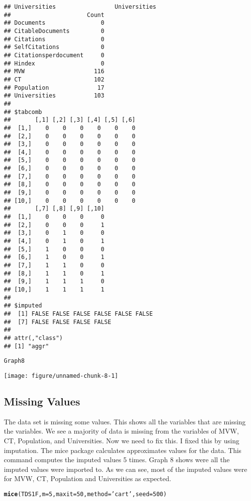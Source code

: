 \documentclass{article}\usepackage[]{graphicx}\usepackage[]{color}
\makeatletter
\def\maxwidth{ %
  \ifdim\Gin@nat@width>\linewidth
    \linewidth
  \else
    \Gin@nat@width
  \fi
}
\newcommand{\hlnum}[1]{\textcolor[rgb]{0.686,0.059,0.569}{#1}}%
\newcommand{\hlstr}[1]{\textcolor[rgb]{0.192,0.494,0.8}{#1}}%
\newcommand{\hlstd}[1]{\textcolor[rgb]{0.345,0.345,0.345}{#1}}%
\newcommand{\hlkwc}[1]{\textcolor[rgb]{0.333,0.667,0.333}{#1}}%
\newcommand{\hlkwd}[1]{\textcolor[rgb]{0.737,0.353,0.396}{\textbf{#1}}}%
\newenvironment{kframe}{%
 \def\at@end@of@kframe{}%
 \ifinner\ifhmode%
  \def\at@end@of@kframe{\end{minipage}}%
  \begin{minipage}{\columnwidth}%
 \fi\fi%
 \def\FrameCommand##1{\hskip\@totalleftmargin \hskip-\fboxsep
 \colorbox{shadecolor}{##1}\hskip-\fboxsep
     \hskip-\linewidth \hskip-\@totalleftmargin \hskip\columnwidth}%
 \MakeFramed {\advance\hsize-\width
   \@totalleftmargin\z@ \linewidth\hsize
   \@setminipage}}%
 {\par\unskip\endMakeFramed%
 \at@end@of@kframe}
\newenvironment{knitrout}{}{} %
\makeatother
\begin{document}
\begin{knitrout}
\begin{kframe}
\begin{verbatim}
## Universities                 Universities
##                      Count
## Documents                0
## CitableDocuments         0
## Citations                0
## SelfCitations            0
## Citationsperdocument     0
## Hindex                   0
## MVW                    116
## CT                     102
## Population              17
## Universities           103
## 
## $tabcomb
##       [,1] [,2] [,3] [,4] [,5] [,6]
##  [1,]    0    0    0    0    0    0
##  [2,]    0    0    0    0    0    0
##  [3,]    0    0    0    0    0    0
##  [4,]    0    0    0    0    0    0
##  [5,]    0    0    0    0    0    0
##  [6,]    0    0    0    0    0    0
##  [7,]    0    0    0    0    0    0
##  [8,]    0    0    0    0    0    0
##  [9,]    0    0    0    0    0    0
## [10,]    0    0    0    0    0    0
##       [,7] [,8] [,9] [,10]
##  [1,]    0    0    0     0
##  [2,]    0    0    0     1
##  [3,]    0    1    0     0
##  [4,]    0    1    0     1
##  [5,]    1    0    0     0
##  [6,]    1    0    0     1
##  [7,]    1    1    0     0
##  [8,]    1    1    0     1
##  [9,]    1    1    1     0
## [10,]    1    1    1     1
## 
## $imputed
##  [1] FALSE FALSE FALSE FALSE FALSE FALSE
##  [7] FALSE FALSE FALSE FALSE
## 
## attr(,"class")
## [1] "aggr"
\end{verbatim}
\begin{alltt}
\hlstd{Graph8}
\end{alltt}
\end{kframe}
\texttt{[image: figure/unnamed-chunk-8-1]} 

\end{knitrout}
\subsection{Missing Values}
The data set is missing some values. This shows all the variables that are missing the variables. We see a majority of data is missing from the variables of MVW, CT, Population, and Universities. Now we need to fix this. I fixed this by using imputation. The mice package calculates approximates values for the data. This command computes the imputed values 5 times. Graph 8 shows were all the imputed values were imported to. As we can see, most of the imputed values were for MVW, CT, Population and Universities as expected.
\begin{knitrout}
\color{fgcolor}\begin{kframe}
\begin{alltt}
\hlkwd{mice}\hlstd{(TDS1F,} \hlkwc{m}\hlstd{=}\hlnum{5}\hlstd{,} \hlkwc{maxit} \hlstd{=} \hlnum{50}\hlstd{,} \hlkwc{method} \hlstd{=} \hlstr{'cart'}\hlstd{,} \hlkwc{seed} \hlstd{=} \hlnum{500}\hlstd{)}
\end{alltt}
\end{kframe}
\end{knitrout}
\end{document}
